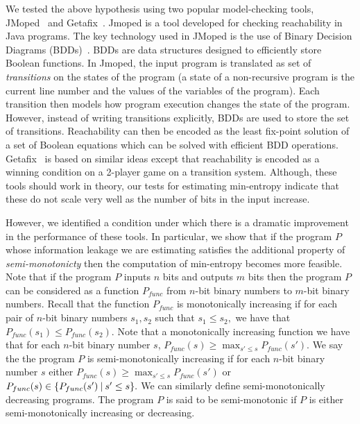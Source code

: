 We tested the above  hypothesis using two popular model-checking tools, JMoped~\cite{Suwimonteerabuth} and Getafix~\cite{Torre}. 
Jmoped is a tool developed for checking reachability in Java programs. The key technology used in JMoped is the use of Binary Decision Diagrams (BDDs)~\cite{Lee}. BDDs are data structures designed to efficiently   store Boolean functions. In Jmoped, the input program is translated  as set of \emph{transitions} on the states of the program (a state of a non-recursive program is the current line number and the values of the variables of the program). Each transition  then models how program execution changes the state of the program.  However, instead of writing transitions explicitly,
BDDs are used to store the set of transitions.  Reachability can then be encoded as  the least fix-point solution of a set of Boolean equations which can be solved with efficient BDD operations. Getafix~\cite{} is based on similar ideas except that reachability is encoded as a winning condition on a 2-player game on a  transition system. 
Although, these tools should work in theory, our tests for estimating min-entropy indicate that these do not scale very well  as the number of bits in the input increase. 


However, we  identified a condition under which there is a dramatic improvement in the performance of these tools. In particular, we show that if the program $P$ whose information leakage we are estimating satisfies the additional property of \emph{semi-monotonicty} then the computation of min-entropy becomes more feasible. Note that  
  if the program $P$ inputs $n$ bits and outputs $m$ bits then the program $P$ can be considered as  a function $P_{func}$ from $n$-bit binary numbers to $m$-bit binary numbers. Recall that the function $P_{func}$ is monotonically increasing  if  for each pair of $n$-bit  binary numbers $s_1, s_2$  such that  $s_1\leq s_2,$ we have that $P_{func}(s_1) \leq P_{func}(s_2).$ Note that a monotonically increasing  function we have that for each $n$-bit binary number $s$, $P_{func}(s) \geq \max_{ s'\leq s} {P_{func}(s')}.$
    We say the the program $P$ is semi-monotonically increasing if for each $n$-bit  binary number $s$ either $P_{func}(s) \geq \max_{ s'\leq s}{P_{func}(s')}$ or $P_{func}(s) \in \{ P_{func}(s') \mathbin{|} s'\leq s \}.$ We can similarly define semi-monotonically decreasing programs. The program $P$ is said to be semi-monotonic if $P$ is either 
    semi-monotonically increasing or decreasing. 

